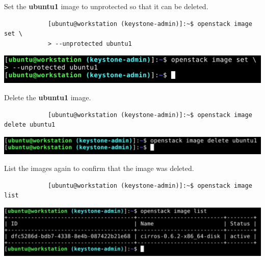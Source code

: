 \documentclass[letterpaper, 12pt]{article}
\begin{document}
\begin{enumerate}
    \begin{labstep}
        Set the \textbf{ubuntu1} image to unprotected so that it can be deleted.
        \begin{lstlisting}
            [ubuntu@workstation (keystone-admin)]:~$ openstack image set \
            > --unprotected ubuntu1
        \end{lstlisting}

        \begin{center}
            \includegraphics[width=\linewidth]{images/part1/step16.png}
        \end{center}
    \end{labstep}

    \begin{labstep}
        Delete the \textbf{ubuntu1} image.
        \begin{lstlisting}
            [ubuntu@workstation (keystone-admin)]:~$ openstack image delete ubuntu1
        \end{lstlisting}

        \begin{center}
            \includegraphics[width=\linewidth]{images/part1/step17.png}
        \end{center}
    \end{labstep}

    \begin{labstep}
        List the images again to confirm that the image was deleted.
        \begin{lstlisting}
            [ubuntu@workstation (keystone-admin)]:~$ openstack image list
        \end{lstlisting}

        \begin{center}
            \includegraphics[width=\linewidth]{images/part1/step18.png}
        \end{center}
    \end{labstep}


\end{enumerate}
\end{document}
